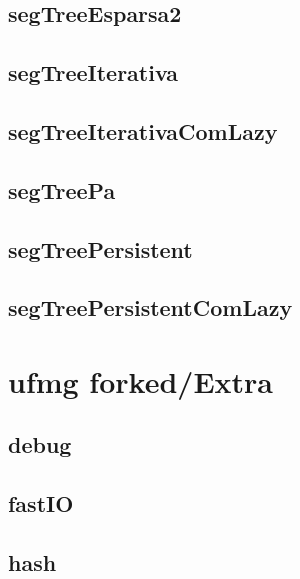 \subsection{segTreeEsparsa2}
\raggedbottom
\hrulefill
\subsection{segTreeIterativa}
\raggedbottom
\hrulefill
\subsection{segTreeIterativaComLazy}
\raggedbottom
\hrulefill
\subsection{segTreePa}
\raggedbottom
\hrulefill
\subsection{segTreePersistent}
\raggedbottom
\hrulefill
\subsection{segTreePersistentComLazy}
\raggedbottom
\hrulefill

\section{ufmg forked/Extra}
\subsection{debug}
\raggedbottom
\hrulefill
\subsection{fastIO}
\raggedbottom
\hrulefill
\subsection{hash}
\raggedbottom
\hrulefill
